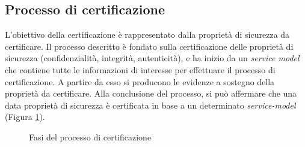 \subsection{Processo di certificazione}


L'obiettivo della certificazione è rappresentato dalla proprietà di sicurezza da certificare.
Il processo descritto è fondato sulla certificazione delle proprietà di sicurezza (confidenzialità, integrità, autenticità), e ha inizio da un \textit{service model} che contiene tutte le informazioni di interesse per effettuare il processo di certificazione.
A partire da esso si producono le evidenze a sostegno della proprietà da certificare.
Alla conclusione del processo, si può affermare che una data proprietà di sicurezza è certificata in base a un determinato \textit{service-model} (Figura \ref{fig:CertSoaFig1a}).

\begin{figure}[H]
\centering
{}
\caption{Fasi del processo di certificazione\cite{CitCertSoa}}\label{fig:CertSoaFig1a}
\end{figure}

